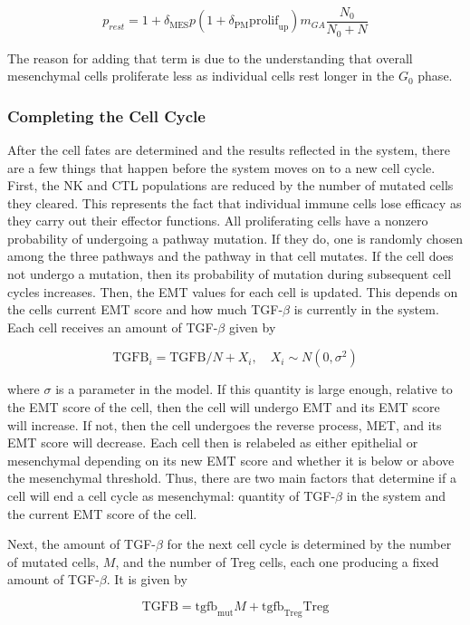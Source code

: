\documentclass[11pt, a4paper, preprint]{article}
\begin{document}
$$ p_{rest} = 1 + \delta_{\text{MES}}p(1+\delta_{\text{PM}}\text{prolif}_{\text{up}})m_{GA}\frac{N_0}{N_0+N} $$ 

The reason for adding that term is due to the understanding that overall mesenchymal cells proliferate less as individual cells rest longer in the $G_0$ phase.

\subsubsection{Completing the Cell Cycle}
After the cell fates are determined and the results reflected in the system, there are a few things that happen before the system moves on to a new cell cycle.
First, the NK and CTL populations are reduced by the number of mutated cells they cleared.
This represents the fact that individual immune cells lose efficacy as they carry out their effector functions. 
All proliferating cells have a nonzero probability of undergoing a pathway mutation.
If they do, one is randomly chosen among the three pathways and the pathway in that cell mutates.
If the cell does not undergo a mutation, then its probability of mutation during subsequent cell cycles increases. 
Then, the EMT values for each cell is updated.
This depends on the cells current EMT score and how much TGF-$\beta$ is currently in the system.
Each cell receives an amount of TGF-$\beta$ given by

$$ \text{TGFB}_i = \text{TGFB}/N + X_i, \quad X_i \sim N(0,\sigma^2)$$

where $\sigma$ is a parameter in the model.
If this quantity is large enough, relative to the EMT score of the cell, then the cell will undergo EMT and its EMT score will increase.
If not, then the cell undergoes the reverse process, MET, and its EMT score will decrease.
Each cell then is relabeled as either epithelial or mesenchymal depending on its new EMT score and whether it is below or above the mesenchymal threshold.
Thus, there are two main factors that determine if a cell will end a cell cycle as mesenchymal: quantity of TGF-$\beta$ in the system and the current EMT score of the cell.

Next, the amount of TGF-$\beta$ for the next cell cycle is determined by the number of mutated cells, $M$, and the number of Treg cells, each one producing a fixed amount of TGF-$\beta$. It is given by

$$ \text{TGFB} = \text{tgfb}_{\text{mut}}M + \text{tgfb}_{\text{Treg}}\text{Treg}$$ %
\end{document}
